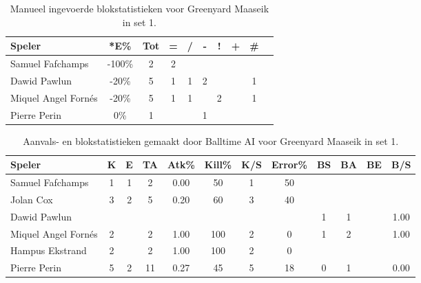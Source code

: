 \begin{table}[ht!]
    \centering
    \scriptsize
    \begin{tabular}{|l|c|c|c|c|c|c|c|c|c|} \hline
        \textbf{Speler} & *E\% & Tot & = & / & - & ! & + & \# \\ \hline
        Samuel Fafchamps & -100\% & 2 & 2 &  &  &  &  & \\ 
        Dawid Pawlun & -20\% & 5 & 1 & 1 & 2 & & & 1 \\ 
        Miquel Angel Fornés & -20\% & 5 & 1 & 1 &  & 2 & & 1 \\
        Pierre Perin & 0\% & 1 &  &  & 1 &  &  &\\ \hline
    \end{tabular}
    \caption[Manueel ingevoerde blokstatistieken voor Greenyard Maaseik in set 1]{\label{tab:PL3BlockMaaseikMan1}Manueel ingevoerde blokstatistieken voor Greenyard Maaseik in set 1.}
\end{table}

\begin{table}[ht!]
  \centering
  \scriptsize
    \begin{tabular}{|l|c|c|c|c|c|c|c|c|c|c|c|} \hline
    \textbf{Speler} & K & E & TA & Atk\% & Kill\% & K/S & Error\% & BS & BA & BE & B/S \\ \hline
    Samuel Fafchamps & 1 & 1 & 2 & 0.00 & 50 & 1 & 50 &  &  &  & \\
    Jolan Cox & 3 & 2 & 5 & 0.20 & 60 & 3 & 40 &   &  &  &  \\
    Dawid Pawlun &   &   &   &   &   &   &   & 1 & 1 & & 1.00\\
    Miquel Angel Fornés & 2 &  & 2 & 1.00 & 100 & 2 & 0 & 1 & 2 & & 1.00\\
    Hampus Ekstrand & 2 &  & 2 & 1.00 & 100 & 2 & 0 &  & & & \\
    Pierre Perin & 5 & 2 & 11 & 0.27 & 45 & 5 & 18 & 0 & 1 &  & 0.00\\ \hline
  \end{tabular}
  \caption[Aanvals- en blokstatistieken gemaakt door Balltime AI voor Greenyard Maaseik in set 1]{\label{tab:PL3AttBlockMaaseikAI1}Aanvals- en blokstatistieken gemaakt door Balltime AI voor Greenyard Maaseik in set 1.}
\end{table}
